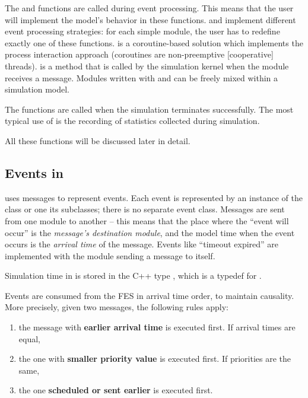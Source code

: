 The  and  functions are
called during event processing. This means that the user will
implement the model's behavior in these functions.
 and  implement
different event processing strategies: for each simple module, the user
has to redefine exactly one of these functions.  is
a coroutine-based solution which implements the
process interaction approach (coroutines are non-pre\-emp\-tive
[cooperative] threads).  is a method that is called
by the simulation kernel when the module receives a message.
Modules written with  and 
can be freely mixed within a simulation model.

The  functions are called when the simulation
terminates successfully. The most typical use of 
is the recording of statistics collected during simulation.

All these functions will be discussed later in detail.





\subsection{Events in {\opp}}

{\opp} uses messages to represent
events. Each event is represented by an instance of the
 class or one its subclasses; there is no separate
event class. Messages are sent from one module to another -- this
means that the place where the ``event will occur'' is the
\textit{message's destination module}, and the model time when the
event occurs is the \textit{arrival time} of the
message. Events like ``timeout expired'' are implemented with the
module sending a message to itself.

Simulation time in {\opp} is stored in the C++ type
, which is a typedef for .

Events are consumed from the FES in arrival time order, to
maintain causality. More precisely, given two messages, the following
rules apply:
\begin{enumerate}
\item{the message with \textbf{earlier arrival time} is executed
    first.  If arrival times are equal,}
\item{the one with \textbf{smaller priority value} is executed first.
    If priorities are the same,}
\item{the one \textbf{scheduled or sent earlier} is executed first.}
\end{enumerate}

